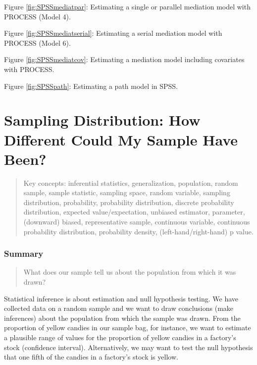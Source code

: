 \documentclass[a4paper]{book}
\theoremstyle{definition}
\theoremstyle{definition}
\theoremstyle{definition}
\theoremstyle{remark}
\begin{document}
Figure \ref{fig:SPSSmediatpar}: Estimating a single or parallel mediation model with
PROCESS (Model 4).




Figure \ref{fig:SPSSmediatserial}: Estimating a serial mediation model with PROCESS
(Model 6).




Figure \ref{fig:SPSSmediatcov}: Estimating a mediation model including covariates
with PROCESS.



Figure \ref{fig:SPSSpath}: Estimating a path model in SPSS.

\chapter{Sampling Distribution: How Different Could My Sample Have
Been?}\label{samp-dist}

\begin{quote}
Key concepts: inferential statistics, generalization, population, random
sample, sample statistic, sampling space, random variable, sampling
distribution, probability, probability distribution, discrete
probability distribution, expected value/expectation, unbiased
estimator, parameter, (downward) biased, representative sample,
continuous variable, continuous probability distribution, probability
density, (left-hand/right-hand) p value.
\end{quote}

\subsection*{Summary}\label{summary}

\begin{quote}
What does our sample tell us about the population from which it was
drawn?
\end{quote}

Statistical inference is about estimation and null hypothesis testing.
We have collected data on a random sample and we want to draw
conclusions (make inferences) about the population from which the sample
was drawn. From the proportion of yellow candies in our sample bag, for
instance, we want to estimate a plausible range of values for the
proportion of yellow candies in a factory's stock (confidence interval).
Alternatively, we may want to test the null hypothesis that one fifth of
the candies in a factory's stock is yellow.
\end{document}
